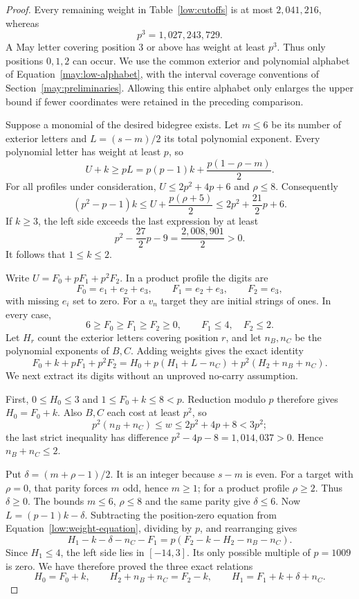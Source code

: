 \begin{proof}
Every remaining weight in Table~\ref{low:cutoffs} is at most $2{,}041{,}216$,
whereas
\[
 p^3=1{,}027{,}243{,}729.
\]
A May letter covering position $3$ or above has weight at least $p^3$.
Thus only positions $0,1,2$ can occur. We use the common exterior and
polynomial alphabet of Equation~\eqref{may:low-alphabet}, with the interval
coverage conventions of Section~\ref{may:preliminaries}.
Allowing this entire alphabet only enlarges the upper bound if fewer
coordinates were retained in the preceding comparison.

Suppose a monomial of the desired bidegree exists.  Let $m\leq6$ be its
number of exterior letters and $L=(s-m)/2$ its total polynomial exponent.
Every polynomial letter has weight at least $p$, so
\[
 U+k\geq pL=p(p-1)k+\frac{p(1-\rho-m)}2.
\]
For all profiles under consideration,
$U\leq2p^2+4p+6$ and $\rho\leq8$.  Consequently
\begin{equation}
 (p^2-p-1)k
 \leq U+\frac{p(\rho+5)}2
 \leq 2p^2+\frac{21}2p+6.
 \label{low:polynomial-cutoff}
\end{equation}
If $k\geq3$, the left side exceeds the last expression by at least
\[
 p^2-\frac{27}2p-9=\frac{2{,}008{,}901}{2}>0.
\]
It follows that $1\leq k\leq2$.

Write $U=F_0+pF_1+p^2F_2$.  In a product profile the digits are
\[
 F_0=e_1+e_2+e_3,\qquad F_1=e_2+e_3,\qquad F_2=e_3,
\]
with missing $e_i$ set to zero.  For a $v_n$ target they are initial
strings of ones.  In every case,
\begin{equation}
 6\geq F_0\geq F_1\geq F_2\geq0,
 \qquad F_1\leq4,\quad F_2\leq2.
 \label{low:digits}
\end{equation}
Let $H_r$ count the exterior letters covering position $r$, and let
$n_B,n_C$ be the polynomial exponents of $B,C$.  Adding weights gives
the exact identity
\begin{equation}
 F_0+k+pF_1+p^2F_2
  =H_0+p(H_1+L-n_C)+p^2(H_2+n_B+n_C).
 \label{low:weight-equation}
\end{equation}
We next extract its digits without an unproved no-carry assumption.

First, $0\leq H_0\leq3$ and $1\leq F_0+k\leq8<p$.  Reduction modulo $p$
therefore gives $H_0=F_0+k$.  Also $B,C$ each cost at least $p^2$, so
\[
 p^2(n_B+n_C)\leq w\leq2p^2+4p+8<3p^2;
\]
the last strict inequality has difference
$p^2-4p-8=1{,}014{,}037>0$.  Hence $n_B+n_C\leq2$.

Put $\delta=(m+\rho-1)/2$.  It is an integer because $s-m$ is even.
For a target with $\rho=0$, that parity forces $m$ odd, hence $m\geq1$;
for a product profile $\rho\geq2$.  Thus $\delta\geq0$.  The bounds
$m\leq6$, $\rho\leq8$ and the same parity give $\delta\leq6$.
Now $L=(p-1)k-\delta$.  Subtracting the position-zero equation from
Equation~\eqref{low:weight-equation}, dividing by $p$, and rearranging gives
\[
 H_1-k-\delta-n_C-F_1
   =p(F_2-k-H_2-n_B-n_C).
\]
Since $H_1\leq4$, the left side lies in $[-14,3]$.  Its only possible
multiple of $p=1009$ is zero.  We have therefore proved the three exact
relations
\begin{equation}
 H_0=F_0+k,\qquad
 H_2+n_B+n_C=F_2-k,\qquad
 H_1=F_1+k+\delta+n_C.
 \label{low:coverage-relations}
\end{equation}


\end{proof}
